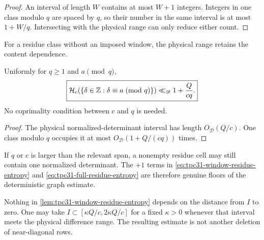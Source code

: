 \begin{proof}
An interval of length $W$ contains at most $W+1$ integers.  Integers
in one class modulo $q$ are spaced by $q$, so their number in the
same interval is at most $1+W/q$.  Intersecting with the physical
range can only reduce either count.
\end{proof}

For a residue class without an imposed window, the physical range
retains the content dependence.

\begin{lemma}
\label{lem:tpc31-full-residue-entropy}
Uniformly for $q\ge1$ and $a\pmod q$,
\begin{equation}
 \boxed{
 \mathcal H_c(\{\delta\in\mathbb Z:\delta\equiv a\!\pmod q\})
 \ll_{\mathscr D}1+\frac Q{cq}.}
 \label{eq:tpc31-full-residue-entropy}
\end{equation}
No coprimality condition between $c$ and $q$ is needed.
\end{lemma}

\begin{proof}
The physical normalized-determinant interval has length
$O_{\mathscr D}(Q/c)$.  One class modulo $q$ occupies it at most
$O_{\mathscr D}(1+Q/(cq))$ times.
\end{proof}

\begin{remark}
\label{rem:tpc31-plus-one}
If $q$ or $c$ is larger than the relevant span, a nonempty residue
cell may still contain one normalized determinant.  The $+1$ terms in
\eqref{eq:tpc31-window-residue-entropy} and
\eqref{eq:tpc31-full-residue-entropy} are therefore genuine floors of
the deterministic graph estimate.
\end{remark}

\begin{remark}
\label{rem:tpc31-macroscopic-window}
Nothing in \cref{lem:tpc31-window-residue-entropy} depends on the
distance from $I$ to zero.  One may take
$I\subset[\kappa Q/c,2\kappa Q/c]$ for a fixed $\kappa>0$ whenever
that interval meets the physical difference range.  The resulting
estimate is not another deletion of near-diagonal rows.
\end{remark}
